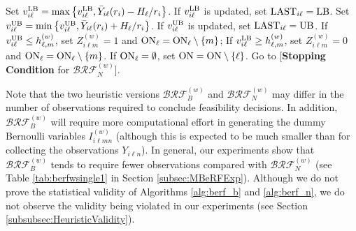 \documentclass[11pt]{article}
\begin{document}
\begin{algorithm}[h!]
{\begin{algorithmic}
       	\State Set $v_{i\ell}^{\rm LB}=\max\left\{v_{i\ell}^{\rm LB}, \bar{Y}_{i\ell}(r_i)-H_\ell/r_i\right\}$. If $v_{i\ell}^{\rm LB}$ is updated, set ${\rm LAST}_{i\ell}={\rm LB}$.
        \State Set $v_{i\ell}^{\rm UB}=\min\left\{v_{i\ell}^{\rm UB}, \bar{Y}_{i\ell}(r_i)+H_\ell/r_i\right\}$. If $v_{i\ell}^{\rm UB}$ is updated, set ${\rm LAST}_{i\ell}={\rm UB}$.
        \State If $v_{i\ell}^{\rm UB}\leq h_{\ell,m}^{(w)}$, set $Z_{i\ell m}^{(w)}=1$ and ${\rm ON}_\ell={\rm ON}_\ell \setminus \{m\}$;
        \State If $v_{i\ell}^{\rm LB}\geq h_{\ell, m}^{(w)}$, set $Z_{i\ell m}^{(w)}=0$ and ${\rm ON}_\ell={\rm ON}_\ell \setminus \{m\}$.
        \EndFor
        \State If ${\rm ON}_\ell=\emptyset$, set ${\rm ON}={\rm ON}\setminus \{\ell\}$.
		\EndFor
        \State Go to [{\bf Stopping Condition} for $\mathcal{BRF}_N^{(w)}$].
		\EndFor%
	\end{algorithmic}
 }
\end{algorithm}


Note that the two heuristic versions $\mathcal{BRF}_B^{(w)}$ and $\mathcal{BRF}_N^{(w)}$ may differ in the number of observations required to conclude feasibility decisions. In addition, $\mathcal{BRF}_B^{(w)}$ will require more computational effort in generating the dummy Bernoulli variables $I_{i\ell mn}^{(w)}$ (although this is expected to be much smaller than for collecting the observations $Y_{i\ell n}$). 
 In general, our experiments show that $\mathcal{BRF}_B^{(w)}$ tends to require fewer observations compared with $\mathcal{BRF}_N^{(w)}$ (see Table \ref{tab:berfwsingle1} in Section \ref{subsec:MBeRFExp}). Although we do not prove the statistical validity of Algorithms  \ref{alg:berf_b} and \ref{alg:berf_n}, we do not observe the validity being violated in our experiments (see Section \ref{subsubsec:HeuristicValidity}). 
\end{document}
